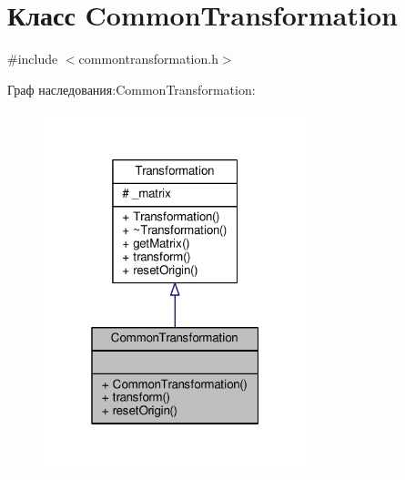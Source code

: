 \hypertarget{class_common_transformation}{}\section{Класс Common\+Transformation}
\label{class_common_transformation}


{\ttfamily \#include $<$commontransformation.\+h$>$}



Граф наследования\+:Common\+Transformation\+:
\nopagebreak
\begin{figure}[H]
\begin{center}
\leavevmode
\includegraphics[width=217pt]{d0/d4d/class_common_transformation__inherit__graph}
\end{center}
\end{figure}


